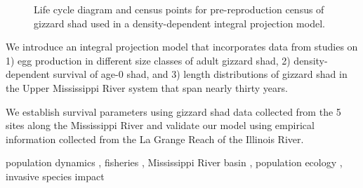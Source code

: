\documentclass[preprint,review,12pt,authoryear]{elsarticle}
\begin{document}
\begin{frontmatter}
\begin{graphicalabstract}
\begin{figure}
\begin{center}
\end{center}
 \caption{\small{Life cycle diagram and census points for pre-reproduction census of gizzard shad used in a density-dependent integral projection model.}}
\end{figure}

\end{graphicalabstract}

\begin{highlights}
\item We introduce an integral projection model that incorporates data from studies on 1) egg production in different size classes of adult gizzard shad, 2) density-dependent survival of age-0 shad, and 3) length distributions of gizzard shad in the Upper Mississippi River system that span nearly thirty years.
\item  We establish survival parameters using gizzard shad data collected from the 5 sites along the Mississippi River and validate our model using empirical information collected from the La Grange Reach of the Illinois River.
\end{highlights}

\begin{keyword}
  population dynamics \sep
  fisheries \sep
  Mississippi River basin \sep
  population ecology \sep
  invasive species impact 

\end{keyword}

\end{frontmatter}
\end{document}
